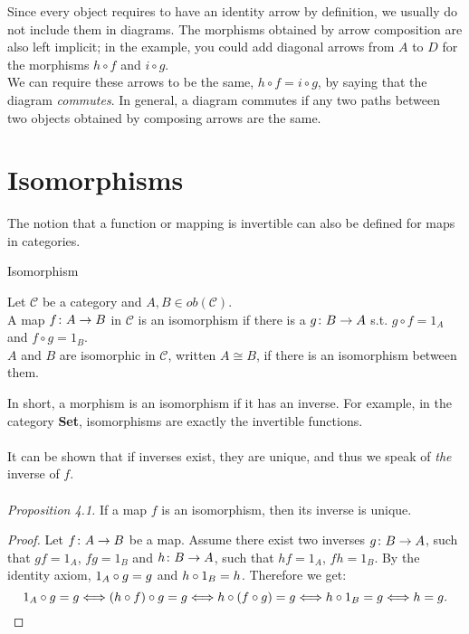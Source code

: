 Since every object requires to have an identity arrow by definition,
we usually do not include them in diagrams. The morphisms obtained by arrow composition are also left implicit; in the example, you could add diagonal arrows from $A$ to $D$ for the morphisms $ h \circ f $ and $ i \circ g $. \\
We can require these arrows to be the same,  $ h \circ f = i \circ g $, by saying that the diagram \emph{commutes}. In general, a diagram commutes if any two paths between two objects
obtained by composing arrows are the same.


\section {Isomorphisms}
The notion that a function or mapping is invertible can also be defined for maps in categories.
\begin{definition}{Isomorphism}

  Let $\mathscr{C}$ be a category and $A, B \in ob(\mathscr{C})$. \\
  A map $f \from A \to B$ in $\mathscr{C}$ is an isomorphism if there is a $g \from B \to A$ s.t. $g \circ f = 1_A$ and $f \circ g = 1_B$. \\
  $A$ and $B$ are isomorphic in $\mathscr{C}$, written $A \cong B$, if there is an isomorphism between them.
\end{definition}

In short, a morphism is an isomorphism if it has an inverse.
For example, in the category \textbf{Set},
isomorphisms are exactly the invertible functions.\\\\
It can be shown that if inverses exist, they are unique, and thus we speak of
\emph{the} inverse of $f$.\\\\
\textit{Proposition 4.1.} If a map $f$ is an isomorphism, then its inverse is unique. 

\begin{proof}
  Let $f \from A \to B$ be a map.
  Assume there exist two inverses $g \from B \to A$, such that $gf = 1_A$, $fg = 1_B$ and \mbox{$h \from B \to A$}, such that $hf = 1_A$, $fh = 1_B$.
  By the identity axiom, $1_A \mathbin{\circ} g = g$ and $h \mathbin{\circ} 1_B = h$. Therefore we get:
 \[  1_A \mathbin{\circ} g = g \Longleftrightarrow (h \mathbin{\circ} f) \mathbin{\circ} g = g \Longleftrightarrow h \mathbin{\circ} (f \mathbin{\circ} g) = g \Longleftrightarrow h \mathbin{\circ} 1_B = g \Longleftrightarrow h=g. \]
\end{proof}


